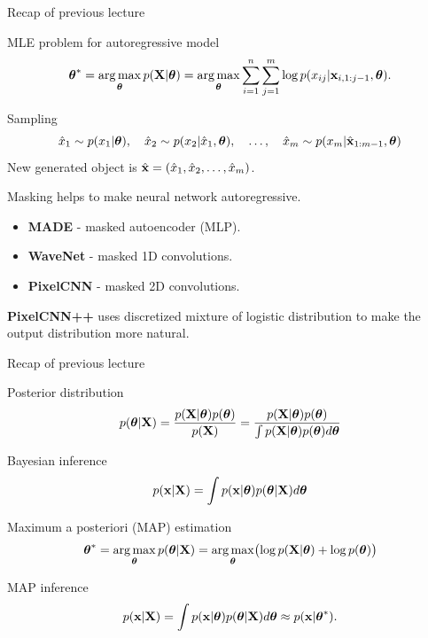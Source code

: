 

\begin{frame}
\titlepage
\end{frame}
\begin{frame}{Recap of previous lecture}
	\begin{block}{MLE problem for autoregressive model}
		\vspace{-0.7cm}
		\[
		\boldsymbol{\theta}^* = \operatorname*{arg\,max}_{\boldsymbol{\theta}} p(\mathbf{X} | \boldsymbol{\theta}) = \operatorname*{arg\,max}_{\boldsymbol{\theta}} \sum_{i=1}^n \sum_{j=1}^m \log p(x_{ij} | \mathbf{x}_{i, 1:j - 1}, \boldsymbol{\theta}).
		\]
		\vspace{-0.7cm}
	\end{block}
	\begin{block}{Sampling}
		\vspace{-0.5cm}
		\[
			\hat{x}_1 \sim p(x_1 | \boldsymbol{\theta}), \quad \hat{x}_2 \sim p(x_2 | \hat{x}_1, \boldsymbol{\theta}), \quad \dots, \quad \hat{x}_m \sim p(x_m | \hat{\mathbf{x}}_{1:m-1}, \boldsymbol{\theta})
		\]
		New generated object is $\hat{\mathbf{x}} = (\hat{x}_1, \hat{x}_2, \dots, \hat{x}_m)$.
	\end{block}
	Masking helps to make neural network autoregressive.
	\begin{itemize}
		\item \textbf{MADE} - masked autoencoder (MLP).
		\item \textbf{WaveNet} - masked 1D convolutions.
		\item \textbf{PixelCNN} - masked 2D convolutions.
	\end{itemize}
	\textbf{PixelCNN++} uses discretized mixture of logistic distribution to make the output distribution more natural.
\end{frame}
\begin{frame}{Recap of previous lecture}
	\begin{block}{Posterior distribution}
		\[
		p(\boldsymbol{\theta} | \mathbf{X}) = \frac{p(\mathbf{X} | \boldsymbol{\theta}) p(\boldsymbol{\theta})}{p(\mathbf{X})} = \frac{p(\mathbf{X} | \boldsymbol{\theta}) p(\boldsymbol{\theta})}{\int p(\mathbf{X} | \boldsymbol{\theta}) p(\boldsymbol{\theta}) d \boldsymbol{\theta}} 
		\]
		\vspace{-0.2cm}
	\end{block}
	\begin{block}{Bayesian inference}
		\vspace{-0.2cm}
		\[
		p(\mathbf{x} | \mathbf{X}) = \int p(\mathbf{x} | \boldsymbol{\theta}) p(\boldsymbol{\theta} | \mathbf{X}) d \boldsymbol{\theta}
		\]
		\vspace{-0.2cm}
	\end{block}
	\begin{block}{Maximum a posteriori (MAP) estimation}
		\vspace{-0.2cm}
		\[
		\boldsymbol{\theta}^* = \operatorname*{arg\,max}_{\boldsymbol{\theta}} p(\boldsymbol{\theta} | \mathbf{X}) = \operatorname*{arg\,max}_{\boldsymbol{\theta}} \bigl(\log p(\mathbf{X} | \boldsymbol{\theta}) + \log p(\boldsymbol{\theta}) \bigr)
		\]
		\vspace{-0.2cm}
	\end{block}
	\begin{block}{MAP inference}
		\[
		p(\mathbf{x} | \mathbf{X}) = \int p(\mathbf{x}| \boldsymbol{\theta}) p(\boldsymbol{\theta} | \mathbf{X} ) d \boldsymbol{\theta} \approx p(\mathbf{x} | \boldsymbol{\theta}^*).
		\]
	\end{block}
\end{frame}
